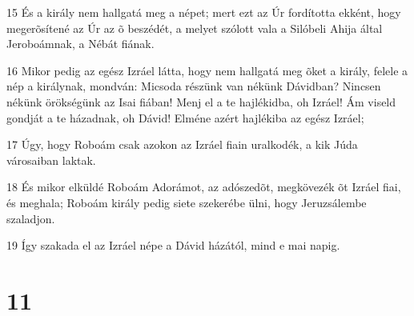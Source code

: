 \par 15 És a király nem hallgatá meg a népet; mert ezt az Úr fordította ekként, hogy megerõsítené az Úr az õ beszédét, a melyet szólott vala a Silóbeli Ahija által  Jeroboámnak, a Nébát fiának.
\par 16 Mikor pedig az egész Izráel látta, hogy nem hallgatá meg õket a király, felele a nép a királynak, mondván: Micsoda részünk van nékünk Dávidban? Nincsen nékünk örökségünk az Isai fiában! Menj el a te hajlékidba, oh Izráel! Ám viseld gondját a te házadnak, oh Dávid! Elméne azért hajlékiba az egész Izráel;
\par 17 Úgy, hogy Roboám csak azokon az Izráel fiain uralkodék, a kik Júda városaiban laktak.
\par 18 És mikor elküldé Roboám Adorámot, az adószedõt, megkövezék õt Izráel fiai, és meghala; Roboám király pedig siete szekerébe ülni, hogy Jeruzsálembe szaladjon.
\par 19 Így szakada el az Izráel népe a Dávid házától, mind e mai napig.

\chapter{11}

